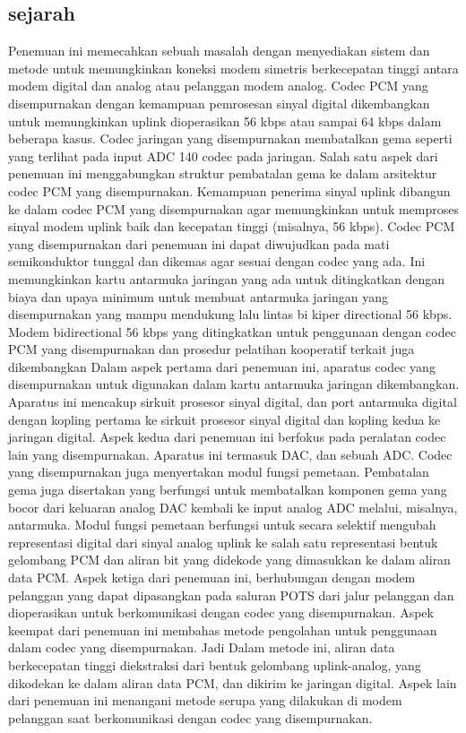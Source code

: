 \subsection{sejarah}
Penemuan ini memecahkan sebuah masalah dengan menyediakan sistem dan metode untuk memungkinkan koneksi modem simetris berkecepatan tinggi antara modem digital dan analog atau pelanggan modem analog. Codec PCM yang disempurnakan dengan kemampuan pemrosesan sinyal digital dikembangkan untuk memungkinkan uplink dioperasikan 56 kbps atau sampai 64 kbps dalam beberapa kasus. Codec jaringan yang disempurnakan membatalkan gema seperti yang terlihat pada input ADC 140 codec pada jaringan. Salah satu aspek dari penemuan ini menggabungkan struktur pembatalan gema ke dalam arsitektur codec PCM yang disempurnakan. Kemampuan penerima sinyal uplink dibangun ke dalam codec PCM yang disempurnakan agar memungkinkan untuk memproses sinyal modem uplink baik dan kecepatan tinggi (misalnya, 56 kbps). Codec PCM yang disempurnakan dari penemuan ini dapat diwujudkan pada mati semikonduktor tunggal dan dikemas agar sesuai dengan codec yang ada. Ini memungkinkan kartu antarmuka jaringan yang ada untuk ditingkatkan dengan biaya dan upaya minimum untuk membuat antarmuka jaringan yang disempurnakan yang mampu mendukung lalu lintas bi kiper directional 56 kbps. Modem bidirectional 56 kbps yang ditingkatkan untuk penggunaan dengan codec PCM yang disempurnakan dan prosedur pelatihan kooperatif terkait juga dikembangkan
Dalam aspek pertama dari penemuan ini, aparatus codec yang disempurnakan untuk digunakan dalam kartu antarmuka jaringan dikembangkan. Aparatus ini mencakup sirkuit prosesor sinyal digital, dan port antarmuka digital dengan kopling pertama ke sirkuit prosesor sinyal digital dan kopling kedua ke jaringan digital.
Aspek kedua dari penemuan ini berfokus pada peralatan codec lain yang disempurnakan. Aparatus ini termasuk DAC, dan sebuah ADC. Codec yang disempurnakan juga menyertakan modul fungsi pemetaan. Pembatalan gema juga disertakan yang berfungsi untuk membatalkan komponen gema yang bocor dari keluaran analog DAC kembali ke input analog ADC melalui, misalnya, antarmuka. Modul fungsi pemetaan berfungsi untuk secara selektif mengubah representasi digital dari sinyal analog uplink ke salah satu representasi bentuk gelombang PCM dan aliran bit yang didekode yang dimasukkan ke dalam aliran data PCM.
Aspek ketiga dari penemuan ini, berhubungan dengan modem pelanggan yang dapat dipasangkan pada saluran POTS dari jalur pelanggan dan dioperasikan untuk berkomunikasi dengan codec yang disempurnakan.
Aspek keempat dari penemuan ini membahas metode pengolahan untuk penggunaan dalam codec yang disempurnakan.
Jadi Dalam metode ini, aliran data berkecepatan tinggi diekstraksi dari bentuk gelombang uplink-analog, yang dikodekan ke dalam aliran data PCM, dan dikirim ke jaringan digital. Aspek lain dari penemuan ini menangani metode serupa yang dilakukan di modem pelanggan saat berkomunikasi dengan codec yang disempurnakan.

